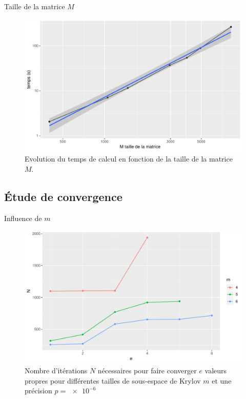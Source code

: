 \documentclass[9.5pt]{beamer}
\begin{document}
		\begin{frame}{Taille de la matrice $M$}
			\begin{figure}
				\centering
				\includegraphics[width = 0.7\linewidth]{../rapport/plots/tvsM.pdf}
				\caption{Evolution du temps de calcul en fonction de la taille de la matrice $M$. \label{fig:tvsM}}
			\end{figure}
		\end{frame}

	\subsection{\'Etude de convergence}
		\begin{frame}{Influence de $m$}
			\begin{figure}
				\centering
				\includegraphics[width=0.8\linewidth, keepaspectratio]{../rapport/plots/Nvse-m_p6.pdf}
				\caption{Nombre d'itérations $N$ nécessaires pour faire converger $e$ valeurs propres pour différentes tailles de sous-espace de Krylov $m$ et une précision $p=\SI{e-6}{}$ \label{fig:Nvse-m_p6}}
			\end{figure}
		\end{frame}
\end{document}
